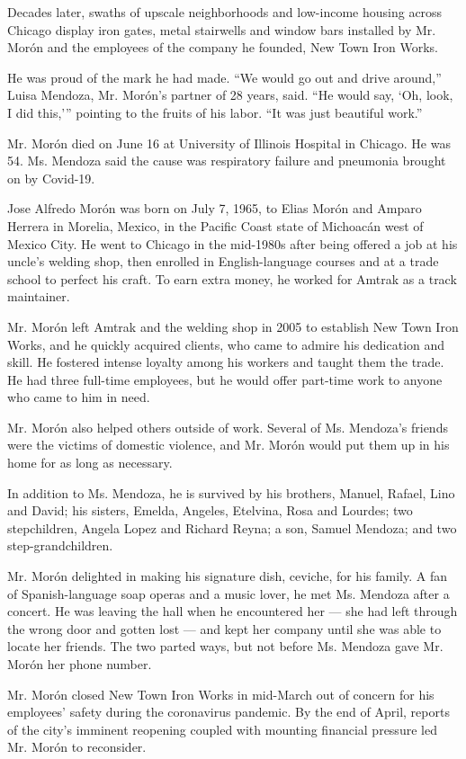 Decades later, swaths of upscale neighborhoods and low-income housing
across Chicago display iron gates, metal stairwells and window bars
installed by Mr. Morón and the employees of the company he founded, New
Town Iron Works.

He was proud of the mark he had made. ``We would go out and drive
around,'' Luisa Mendoza, Mr. Morón's partner of 28 years, said. ``He
would say, `Oh, look, I did this,''' pointing to the fruits of his
labor. ``It was just beautiful work.''

Mr. Morón died on June 16 at University of Illinois Hospital in Chicago.
He was 54. Ms. Mendoza said the cause was respiratory failure and
pneumonia brought on by Covid-19.

Jose Alfredo Morón was born on July 7, 1965, to Elias Morón and Amparo
Herrera in Morelia, Mexico, in the Pacific Coast state of Michoacán west
of Mexico City. He went to Chicago in the mid-1980s after being offered
a job at his uncle's welding shop, then enrolled in English-language
courses and at a trade school to perfect his craft. To earn extra money,
he worked for Amtrak as a track maintainer.

Mr. Morón left Amtrak and the welding shop in 2005 to establish New Town
Iron Works, and he quickly acquired clients, who came to admire his
dedication and skill. He fostered intense loyalty among his workers and
taught them the trade. He had three full-time employees, but he would
offer part-time work to anyone who came to him in need.

Mr. Morón also helped others outside of work. Several of Ms. Mendoza's
friends were the victims of domestic violence, and Mr. Morón would put
them up in his home for as long as necessary.

In addition to Ms. Mendoza, he is survived by his brothers, Manuel,
Rafael, Lino and David; his sisters, Emelda, Angeles, Etelvina, Rosa and
Lourdes; two stepchildren, Angela Lopez and Richard Reyna; a son, Samuel
Mendoza; and two step-grandchildren.

Mr. Morón delighted in making his signature dish, ceviche, for his
family. A fan of Spanish-language soap operas and a music lover, he met
Ms. Mendoza after a concert. He was leaving the hall when he encountered
her --- she had left through the wrong door and gotten lost --- and kept
her company until she was able to locate her friends. The two parted
ways, but not before Ms. Mendoza gave Mr. Morón her phone number.

Mr. Morón closed New Town Iron Works in mid-March out of concern for his
employees' safety during the coronavirus pandemic. By the end of April,
reports of the city's imminent reopening coupled with mounting financial
pressure led Mr. Morón to reconsider.

